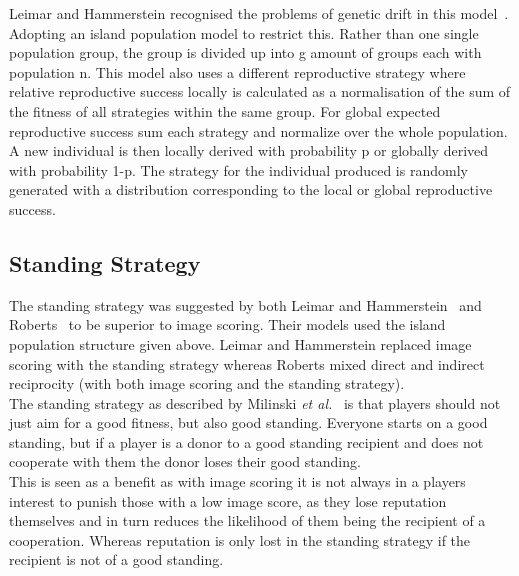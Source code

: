 \documentclass[twoside,twocolumn]{article}
\begin{document}
Leimar and Hammerstein recognised the problems of genetic drift in this model~\cite{leimarhammer}. Adopting an island population model to restrict this. Rather than one single population group, the group is divided up into g amount of groups each with population n. This model also uses a different reproductive strategy where relative reproductive success locally is calculated as a normalisation of the sum of the fitness of all strategies within the same group. For global expected reproductive success sum each strategy and normalize over the whole population. A new individual is then locally derived with probability p or globally derived with probability 1-p. The strategy for the individual produced is randomly generated with a distribution corresponding to the local or global reproductive success.

\subsection{Standing Strategy}
The standing strategy was suggested by both Leimar and Hammerstein~\cite{leimarhammer} and Roberts~\cite{evoldirindir} to be superior to image scoring. Their models used the island population structure given above. Leimar and Hammerstein replaced image scoring with the standing strategy whereas Roberts mixed direct and indirect reciprocity (with both image scoring and the standing strategy).\\
The standing strategy as described by Milinski \textit{et al.}~\cite{imagevsstanding} is that players should not just aim for a good fitness, but also good standing. Everyone starts on a good standing, but if a player is a donor to a good standing recipient and does not cooperate with them the donor loses their good standing.\\
This is seen as a benefit as with image scoring it is not always in a players interest to punish those with a low image score, as they lose reputation themselves and in turn reduces the likelihood of them being the recipient of a cooperation. Whereas reputation is only lost in the standing strategy if the recipient is not of a good standing.
\end{document}
